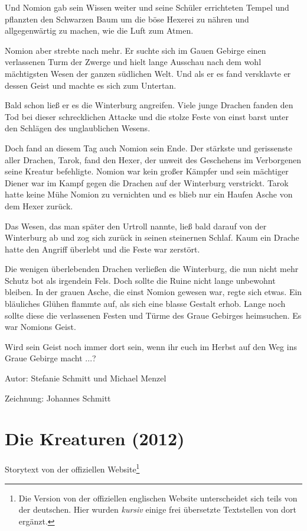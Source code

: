 \documentclass[10pt, a4paper, oneside]{book}
\newcommand{\fillbreak}{\vspace*{\fill}\columnbreak}
\newcommand{\storytext}[1]{%
    \section{#1}%
    \label{Storytext: #1}%
}
\begin{document}
\begin{multicols}{2}
Und Nomion gab sein Wissen weiter und seine Schüler errichteten Tempel und pflanzten den Schwarzen Baum um die böse Hexerei zu nähren und allgegenwärtig zu machen, wie die Luft zum Atmen.\bigskip

Nomion aber strebte nach mehr. Er suchte sich im Gauen Gebirge einen verlassenen Turm der Zwerge und hielt lange Ausschau nach dem wohl mächtigsten Wesen der ganzen südlichen Welt. Und als er es fand versklavte er dessen Geist und machte es sich zum Untertan.\bigskip

Bald schon ließ er es die Winterburg angreifen. Viele junge Drachen fanden den Tod bei dieser schrecklichen Attacke und die stolze Feste von einst barst unter den Schlägen des unglaublichen Wesens.\bigskip

Doch fand an diesem Tag auch Nomion sein Ende. Der stärkste und gerissenste aller Drachen, Tarok, fand den Hexer, der unweit des Geschehens im Verborgenen seine Kreatur befehligte. Nomion war kein großer Kämpfer und sein mächtiger Diener war im Kampf gegen die Drachen auf der Winterburg verstrickt. Tarok hatte keine Mühe Nomion zu vernichten und es blieb nur ein Haufen Asche von dem Hexer zurück.\bigskip

Das Wesen, das man später den Urtroll nannte, ließ bald darauf von der Winterburg ab und zog sich zurück in seinen steinernen Schlaf. Kaum ein Drache hatte den Angriff überlebt und die Feste war zerstört.\bigskip

Die wenigen überlebenden Drachen verließen die Winterburg, die nun nicht mehr Schutz bot als irgendein Fels. Doch sollte die Ruine nicht lange unbewohnt bleiben. In der grauen Asche, die einst Nomion gewesen war, regte sich etwas. Ein bläuliches Glühen flammte auf, als sich eine blasse Gestalt erhob. Lange noch sollte diese die verlassenen Festen und Türme des Graue Gebirges heimsuchen. Es war Nomions Geist.\bigskip

Wird sein Geist noch immer dort sein, wenn ihr euch im Herbst auf den Weg ins Graue Gebirge macht ...?    \bigskip  

Autor: Stefanie Schmitt und Michael Menzel

Zeichnung: Johannes Schmitt



\fillbreak
\storytext{Die Kreaturen (2012)}

\begin{center}
    Storytext von der offiziellen Website\footnote{Die Version von der offiziellen englischen Website unterscheidet sich teils von der deutschen. Hier wurden \textit{kursiv} einige frei übersetzte Textstellen von dort ergänzt.}
\end{center}


\end{multicols}
\end{document}
